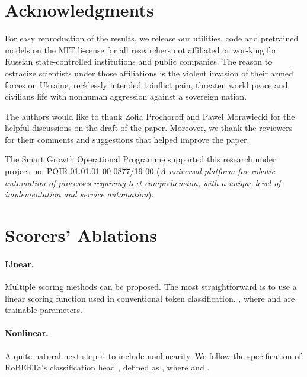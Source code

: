 \documentclass{article}
\begin{document}
\section*{Acknowledgments}

For easy reproduction of the results, we release our \linebreak utilities, code and pretrained models on the MIT li-\linebreak cense for all researchers not affiliated or wor-\linebreak king for Russian state-controlled institutions and \linebreak public companies. The reason to ostracize scientists \linebreak under those affiliations is the violent invasion of \linebreak their armed forces on Ukraine, recklessly intended to\linebreak inflict pain, threaten world peace and civilians life with nonhuman aggression against a sovereign nation.

The authors would like to thank Zofia Prochoroff and Paweł Morawiecki for the helpful discussions on the draft of the paper. Moreover, we thank the reviewers for their comments and suggestions that helped improve the paper.

The Smart Growth Operational Programme supported this research under project no. POIR.01.01.01-00-0877\linebreak/19-00 (\textit{A universal platform for robotic automation of processes requiring text comprehension, with a unique level of implementation and service automation}).


\appendix
\clearpage
\newpage



\section{Scorers' Ablations}\label{ablations_scorers}

\paragraph{Linear.} 
Multiple scoring methods can be proposed. The most straightforward is to use a linear scoring function used in conventional token classification, , where  and  are trainable parameters.

\paragraph{Nonlinear.} 
A quite natural next step is to include nonlinearity. We follow the specification of RoBERTa's classification head \citep{liu2019roberta}, defined as , where  and .
\end{document}
